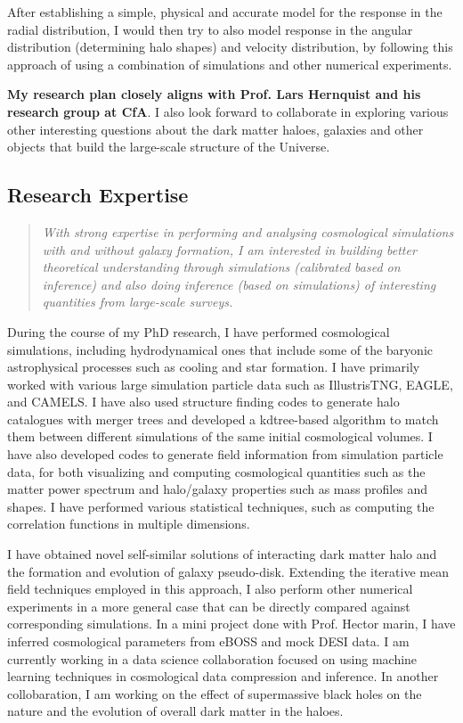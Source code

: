 \documentclass[10pt]{article}
\begin{document}
After establishing a simple, physical and accurate model for the response in the radial distribution, I would then try to also model response in the angular distribution (determining halo shapes) and velocity distribution, by following this approach of using a combination of simulations and other numerical experiments.

\textbf{My research plan closely aligns with Prof. Lars Hernquist and his research group at CfA}. I also look forward to collaborate in exploring various other interesting questions about the dark matter haloes, galaxies and other objects that build the large-scale structure of the Universe.

\subsection{Research Expertise}

\begin{quote}
    \textit{With strong expertise in performing and analysing cosmological simulations with and without galaxy formation, I am interested in building better theoretical understanding through simulations (calibrated based on inference) and also doing inference (based on simulations) of interesting quantities from large-scale surveys.}
\end{quote}

During the course of my PhD research, I have performed cosmological simulations, including hydrodynamical ones that include some of the baryonic astrophysical processes such as cooling and star formation. I have primarily worked with various large simulation particle data such as IllustrisTNG, EAGLE, and CAMELS. I have also used structure finding codes to generate halo catalogues with merger trees and developed a kdtree-based algorithm to match them between different simulations of the same initial cosmological volumes. I have also developed codes to generate field information from simulation particle data, for both visualizing and computing cosmological quantities such as the matter power spectrum and halo/galaxy properties such as mass profiles and shapes. I have performed various statistical techniques, such as computing the correlation functions in multiple dimensions. 

I have obtained novel self-similar solutions of interacting dark matter halo and the formation and evolution of galaxy pseudo-disk. Extending the iterative mean field techniques employed in this approach, I also perform other numerical experiments in a more general case that can be directly compared against corresponding simulations. In a mini project done with Prof. Hector marin, I have inferred cosmological parameters from eBOSS and mock DESI data. I am currently working in a data science collaboration focused on using machine learning techniques in cosmological data compression and inference. In another collobaration, I am working on the effect of supermassive black holes on the nature and the evolution of overall dark matter in the haloes.
\end{document}
